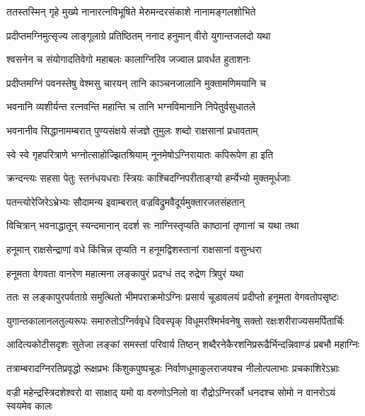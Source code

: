 \twolineshloka
{ततस्तस्मिन् गृहे मुख्ये नानारत्नविभूषिते}
{मेरुमन्दरसंकाशे नानामङ्गलशोभिते} %

\twolineshloka
{प्रदीप्तमग्निमुत्सृज्य लाङ्गूलाग्रे प्रतिष्ठितम्}
{ननाद हनुमान् वीरो युगान्तजलदो यथा} %

\twolineshloka
{श्वसनेन च संयोगादतिवेगो महाबलः}
{कालाग्निरिव जज्वाल प्रावर्धत हुताशनः} %

\twolineshloka
{प्रदीप्तमग्निं पवनस्तेषु वेश्मसु चारयन्}
{तानि काञ्चनजालानि मुक्तामणिमयानि च} %

\twolineshloka
{भवनानि व्यशीर्यन्त रत्नवन्ति महान्ति च}
{तानि भग्नविमानानि निपेतुर्वसुधातले} %

\twolineshloka
{भवनानीव सिद्धानामम्बरात् पुण्यसंक्षये}
{संजज्ञे तुमुलः शब्दो राक्षसानां प्रधावताम्} %

\twolineshloka
{स्वे स्वे गृहपरित्राणे भग्नोत्साहोज्झितश्रियाम्}
{नूनमेषोऽग्निरायातः कपिरूपेण हा इति} %

\twolineshloka
{क्रन्दन्त्यः सहसा पेतुः स्तनंधयधराः स्त्रियः}
{काश्चिदग्निपरीताङ्ग्यो हर्म्येभ्यो मुक्तमूर्धजाः} %

\twolineshloka
{पतन्त्योरेजिरेऽभ्रेभ्यः सौदामन्य इवाम्बरात्}
{वज्रविद्रुमवैदूर्यमुक्तारजतसंहतान्} %

\twolineshloka
{विचित्रान् भवनाद्धातून् स्यन्दमानान् ददर्श सः}
{नाग्निस्तृप्यति काष्ठानां तृणानां च यथा तथा} %

\twolineshloka
{हनूमान् राक्षसेन्द्राणां वधे किंचिन्न तृप्यति}
{न हनूमद्विशस्तानां राक्षसानां वसुन्धरा} %

\twolineshloka
{हनूमता वेगवता वानरेण महात्मना}
{लङ्कापुरं प्रदग्धं तद् रुद्रेण त्रिपुरं यथा} %

\twolineshloka
{ततः स लङ्कापुरपर्वताग्रे समुत्थितो भीमपराक्रमोऽग्निः}
{प्रसार्य चूडावलयं प्रदीप्तो हनूमता वेगवतोपसृष्टः} %

\twolineshloka
{युगान्तकालानलतुल्यरूपः समारुतोऽग्निर्ववृधे दिवस्पृक्}
{विधूमरश्मिर्भवनेषु सक्तो रक्षःशरीराज्यसमर्पितार्चिः} %

\twolineshloka
{आदित्यकोटीसदृशः सुतेजा लङ्कां समस्तां परिवार्य तिष्ठन्}
{शब्दैरनेकैरशनिप्ररूढैर्भिन्दन्निवाण्डं प्रबभौ महाग्निः} %

\twolineshloka
{तत्राम्बरादग्निरतिप्रवृद्धो रूक्षप्रभः किंशुकपुष्पचूडः}
{निर्वाणधूमाकुलराजयश्च नीलोत्पलाभाः प्रचकाशिरेऽभ्राः} %

\twolineshloka
{वज्री महेन्द्रस्त्रिदशेश्वरो वा साक्षाद् यमो वा वरुणोऽनिलो वा}
{रौद्रोऽग्निरर्को धनदश्च सोमो न वानरोऽयं स्वयमेव कालः} %

